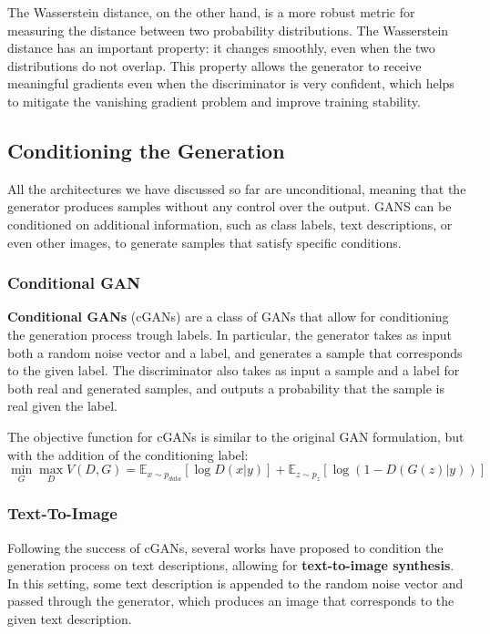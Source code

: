 The Wasserstein distance, on the other hand, is a more robust metric for measuring the distance between two probability distributions.
The Wasserstein distance has an important property: it changes smoothly, even when the two distributions do not overlap.
This property allows the generator to receive meaningful gradients even when the discriminator is very confident, which helps to mitigate the vanishing gradient problem and improve training stability.

\subsection{Conditioning the Generation}
All the architectures we have discussed so far are unconditional, meaning that the generator produces samples without any control over the output.
GANS can be conditioned on additional information, such as class labels, text descriptions, or even other images, to generate samples that satisfy specific conditions.

\subsubsection{Conditional GAN}
\textbf{Conditional GANs} (cGANs) are a class of GANs that allow for conditioning the generation process trough labels.
In particular, the generator takes as input both a random noise vector and a label, and generates a sample that corresponds to the given label.
The discriminator also takes as input a sample and a label for both real and generated samples, and outputs a probability that the sample is real given the label.

The objective function for cGANs is similar to the original GAN formulation, but with the addition of the conditioning label:
\begin{equation}
    \min_G \max_D V(D, G) = \mathbb{E}_{x \sim p_{data}}[\log D(x | y)] + \mathbb{E}_{z \sim p_z}[\log(1 - D(G(z) | y))]
\end{equation}

\subsubsection{Text-To-Image}
Following the success of cGANs, several works have proposed to condition the generation process on text descriptions, allowing for \textbf{text-to-image synthesis}.
In this setting, some text description is appended to the random noise vector and passed through the generator, which produces an image that corresponds to the given text description.


